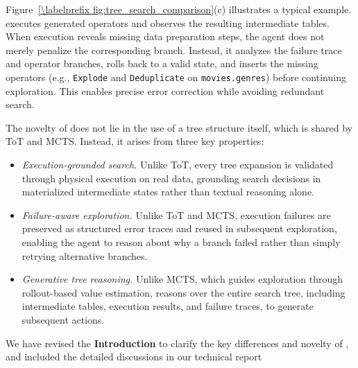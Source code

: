 Figure~\ref{\labelprefix fig:tree_search_comparison}(c) illustrates a typical example. \sys executes generated operators and observes the resulting intermediate tables. When execution reveals missing data preparation steps, the agent does not merely penalize the corresponding branch. Instead, it analyzes the failure trace and operator branches, rolls back to a valid state, and inserts the missing operators (e.g., \texttt{Explode} and \texttt{Deduplicate} on \texttt{movies.genres}) before continuing exploration. This enables precise error correction while avoiding redundant search.

The novelty of \sys does not lie in the use of a tree structure itself, which is shared by ToT and MCTS. Instead, it arises from three key properties:
%
\begin{itemize}[leftmargin=*]
    \item \emph{Execution-grounded search.} Unlike ToT, every tree expansion is validated through physical execution on real data, grounding search decisions in materialized intermediate states rather than textual reasoning alone.
    \item \emph{Failure-aware exploration.} Unlike ToT and MCTS, execution failures are preserved as structured error traces and reused in subsequent exploration, enabling the agent to reason about why a branch failed rather than simply retrying alternative branches.
    \item \emph{Generative tree reasoning.} Unlike MCTS, which guides exploration through rollout-based value estimation, \sys reasons over the entire search tree, including intermediate tables, execution results, and failure traces, to generate subsequent actions.
\end{itemize}

{We have revised the \textbf{Introduction} to clarify the key differences and novelty of \sys, and included the detailed discussions in our technical report~\cite{technical_report}}

